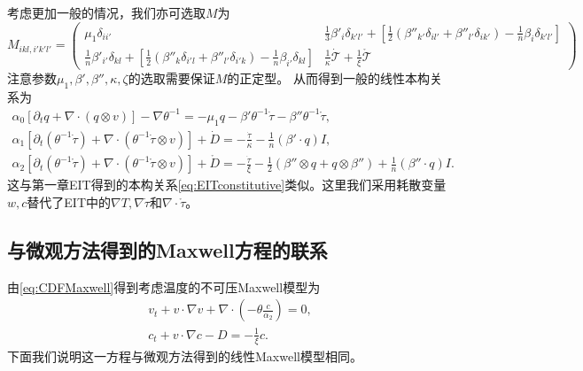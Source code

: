 	考虑更加一般的情况，我们亦可选取$M$为
	\begin{equation*}
		M_{ikl,i'k'l'} = \left( \begin{array}{ccc} 
			\mu_1 \delta_{ii' } & \frac{1}{3}\beta'_i \delta_{k'l'} +  [\frac{1}{2} (\beta''_{k'} \delta_{il'} + \beta''_{l'} \delta_{ik'}) - \frac{1}{n} \beta_{i} \delta_{k'l'}]\\
			\frac{1}{n}\beta'_{i'} \delta_{kl} +  [\frac{1}{2} (\beta''_{k} \delta_{i'l} + \beta''_{l'} \delta_{i'k}) - \frac{1}{n} \beta_{i'} \delta_{kl}] &  \frac{1}{\kappa} \dot{\mathcal{T}} + \frac{1}{\xi} \mathring{\mathcal{T}}  
		\end{array} \right)
	\end{equation*} 
	注意参数$\mu_1,\beta',\beta'',\kappa,\zeta$的选取需要保证$M$的正定型。
	从而得到一般的线性本构关系为
	\begin{subequations}
		\begin{align*}
			\alpha_0 [\partial_t q +  \nabla \cdot (q \otimes v)] - \nabla \theta^{-1} = - \mu_1 q -\beta' \theta^{-1} \dot{\tau} - \beta'' \theta^{-1} \mathring{\tau} , \\
			\alpha_1[\partial_t (\theta^{-1} \dot{\tau}) + \nabla \cdot (\theta^{-1} \dot{\tau} \otimes v)] + \dot{D} = -\frac{\dot{\tau}}{\kappa} - \frac{1}{n}(\beta' \cdot q) I, \\
			\alpha_2[\partial_t (\theta^{-1} \mathring{\tau}) + \nabla \cdot (\theta^{-1} \mathring{\tau} \otimes v)] + \mathring{D} = -\frac{\dot{\tau}}{\xi} - \frac{1}{2} (\beta''  \otimes q + q \otimes \beta'') + \frac{1}{n}(\beta'' \cdot q) I. 
		\end{align*}
	\end{subequations}
	这与第一章EIT得到的本构关系\eqref{eq:EITconstitutive}类似。这里我们采用耗散变量$w,c$替代了EIT中的$\nabla T, \nabla \dot{\tau}$和$\nabla \cdot{\mathring{\tau}}$。
    
	\subsection{与微观方法得到的Maxwell方程的联系}

	由\eqref{eq:CDFMaxwell}得到考虑温度的不可压Maxwell模型为
	\begin{subequations} \label{eq:Tmaxwell}
	\begin{align}
		v_t + v \cdot \nabla v + \nabla \cdot (-\theta \frac{c}{\alpha_2}) = 0, \\
		c_t + v \cdot \nabla c - D = -\frac{1}{\xi} c.
		\end{align}
	\end{subequations}
	下面我们说明这一方程与微观方法得到的线性Maxwell模型相同。

